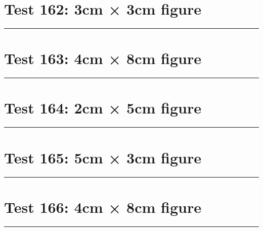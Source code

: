 \documentclass[a4paper,11pt]{article}
\begin{document}
\section*{Test 162: 3cm × 3cm figure}
\begin{swarmwrap}%
  \begin{minipage}[t]{3cm}
    \centering
    \rule{\linewidth}{3cm}
  \end{minipage}%
\end{swarmwrap}%
\swarmwrapnext
\lipsum[81]
\lipsum[82]
\lipsum[83]
\section*{Test 163: 4cm × 8cm figure}
\begin{swarmwrap}%
  \begin{minipage}[t]{4cm}
    \centering
    \rule{\linewidth}{8cm}
  \end{minipage}%
\end{swarmwrap}%
\swarmwrapnext
\lipsum[52]
\lipsum[53]
\lipsum[54]
\lipsum[55]
\lipsum[56]
\lipsum[57]
\section*{Test 164: 2cm × 5cm figure}
\begin{swarmwrap}%
  \begin{minipage}[t]{2cm}
    \centering
    \rule{\linewidth}{5cm}
  \end{minipage}%
\end{swarmwrap}%
\swarmwrapnext
\lipsum[79]
\lipsum[80]
\lipsum[81]
\section*{Test 165: 5cm × 3cm figure}
\begin{swarmwrap}%
  \begin{minipage}[t]{5cm}
    \centering
    \rule{\linewidth}{3cm}
  \end{minipage}%
\end{swarmwrap}%
\swarmwrapnext
\lipsum[90]
\lipsum[91]
\lipsum[92]
\section*{Test 166: 4cm × 8cm figure}
\begin{swarmwrap}%
  \begin{minipage}[t]{4cm}
    \centering
    \rule{\linewidth}{8cm}
  \end{minipage}%
\end{swarmwrap}%
\swarmwrapnext
\lipsum[19]
\lipsum[20]
\lipsum[21]
\lipsum[22]
\lipsum[23]
\end{document}

